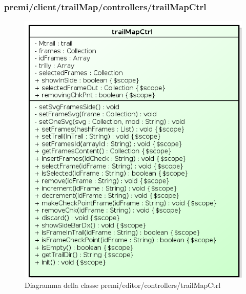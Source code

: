 \subsubsection{premi/client/trailMap/controllers/trailMapCtrl}
\begin{figure}[H]
\begin{center}
\includegraphics[scale=0.85]{img/diacla/TrailMapCtrl.png}
\caption{Diagramma della classe premi/editor/controllers/trailMapCtrl}
\end{center}
\end{figure}


